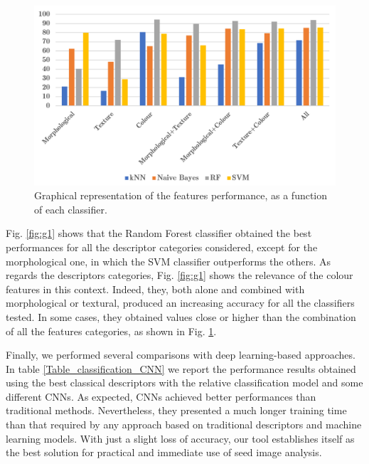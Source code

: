 \documentclass[twocolumn]{svjour3}           %
\begin{document}
\begin{figure}[tbhp]
	\centering
	\includegraphics[scale=0.60]{fig_g2.png}
	\caption{Graphical representation of the features performance, as a function of each classifier.}
	\label{fig:g2}
\end{figure}

Fig. \ref{fig:g1} shows that the Random Forest classifier obtained the best performances for all the descriptor categories considered, except for the morphological one, in which the SVM classifier outperforms the others. 
As regards the descriptors categories, Fig. \ref{fig:g1} shows the relevance of the colour features in this context. Indeed, they, both alone and combined with morphological or textural, produced an increasing accuracy for all the classifiers tested. In some cases, they obtained values close or higher than the combination of all the features categories, as shown in Fig. \ref{fig:g2}.

Finally, we performed several comparisons with deep learning-based approaches. In table \ref{Table_classification_CNN} we report the performance results obtained using the best classical descriptors with the relative classification model and some different CNNs. As expected, CNNs achieved better performances than traditional methods. Nevertheless, they presented a much longer training time than that required by any approach based on traditional descriptors and machine learning models. With just a slight loss of accuracy, our tool establishes itself as the best solution for practical and immediate use of seed image analysis. 
\end{document}
